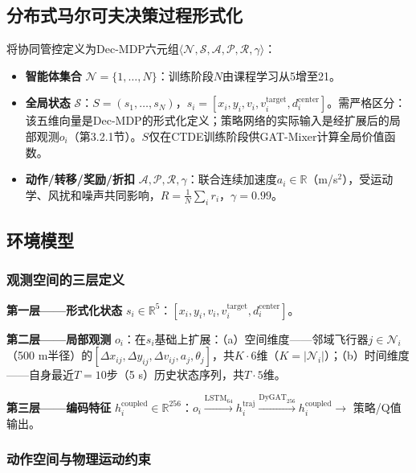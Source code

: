 \documentclass[12pt,a4paper,UTF8]{ctexart}
\begin{document}
\subsection{分布式马尔可夫决策过程形式化}

将协同管控定义为Dec-MDP六元组$\langle \mathcal{N}, \mathcal{S}, \mathcal{A}, \mathcal{P}, \mathcal{R}, \gamma \rangle$：

\begin{itemize}
    \item \textbf{智能体集合} $\mathcal{N} = \{1, \ldots, N\}$：训练阶段$N$由课程学习从5增至21。
    \item \textbf{全局状态} $\mathcal{S}$：$S = (s_1, \ldots, s_N)$，$s_i = [x_i, y_i, v_i, v_i^{\text{target}}, d_i^{\text{center}}]$。需严格区分：该五维向量是Dec-MDP的形式化定义；策略网络的实际输入是经扩展后的局部观测$o_i$（第3.2.1节）。$S$仅在CTDE训练阶段供GAT-Mixer计算全局价值函数。
    \item \textbf{动作/转移/奖励/折扣} $\mathcal{A}, \mathcal{P}, \mathcal{R}, \gamma$：联合连续加速度$a_i \in \mathbb{R}$（m/s$^2$），受运动学、风扰和噪声共同影响，$R = \frac{1}{N}\sum_i r_i$，$\gamma = 0.99$。
\end{itemize}

\subsection{环境模型}

\subsubsection{观测空间的三层定义}

\textbf{第一层——形式化状态} $s_i \in \mathbb{R}^5$：$[x_i, y_i, v_i, v_i^{\text{target}}, d_i^{\text{center}}]$。

\textbf{第二层——局部观测} $o_i$：在$s_i$基础上扩展：（a）空间维度——邻域飞行器$j \in \mathcal{N}_i$（500 m半径）的$[\Delta x_{ij}, \Delta y_{ij}, \Delta v_{ij}, a_j, \theta_j]$，共$K\cdot6$维（$K=|\mathcal{N}_i|$）；（b）时间维度——自身最近$T=10$步（5 s）历史状态序列，共$T\cdot5$维。

\textbf{第三层——编码特征} $h_i^{\text{coupled}} \in \mathbb{R}^{256}$：$o_i \xrightarrow{\text{LSTM}_{64}} h_i^{\text{traj}} \xrightarrow{\text{DyGAT}_{256}} h_i^{\text{coupled}} \to$ 策略/Q值输出。

\subsubsection{动作空间与物理运动约束}
\end{document}
